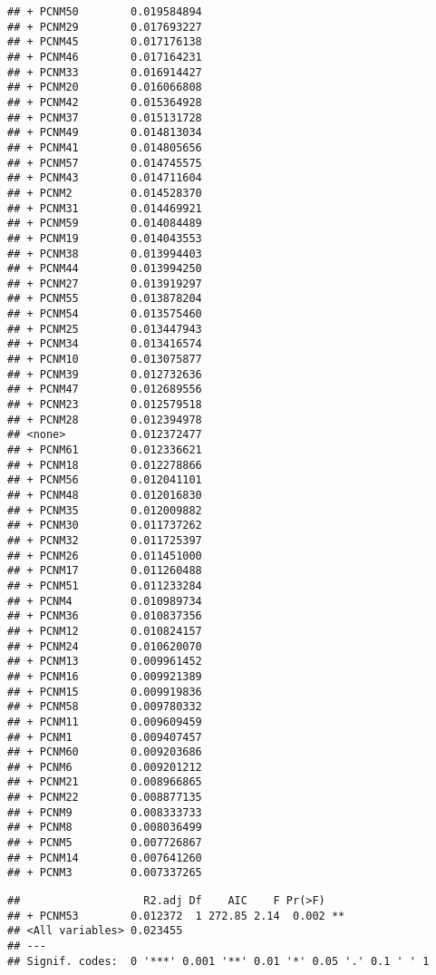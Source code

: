\documentclass[
]{article}
\newenvironment{Shaded}{\begin{snugshade}}{\end{snugshade}}
\newcommand{\NormalTok}[1]{#1}
\newcommand{\OperatorTok}[1]{\textcolor[rgb]{0.81,0.36,0.00}{\textbf{#1}}}
\begin{document}
\begin{verbatim}
## + PCNM50        0.019584894
## + PCNM29        0.017693227
## + PCNM45        0.017176138
## + PCNM46        0.017164231
## + PCNM33        0.016914427
## + PCNM20        0.016066808
## + PCNM42        0.015364928
## + PCNM37        0.015131728
## + PCNM49        0.014813034
## + PCNM41        0.014805656
## + PCNM57        0.014745575
## + PCNM43        0.014711604
## + PCNM2         0.014528370
## + PCNM31        0.014469921
## + PCNM59        0.014084489
## + PCNM19        0.014043553
## + PCNM38        0.013994403
## + PCNM44        0.013994250
## + PCNM27        0.013919297
## + PCNM55        0.013878204
## + PCNM54        0.013575460
## + PCNM25        0.013447943
## + PCNM34        0.013416574
## + PCNM10        0.013075877
## + PCNM39        0.012732636
## + PCNM47        0.012689556
## + PCNM23        0.012579518
## + PCNM28        0.012394978
## <none>          0.012372477
## + PCNM61        0.012336621
## + PCNM18        0.012278866
## + PCNM56        0.012041101
## + PCNM48        0.012016830
## + PCNM35        0.012009882
## + PCNM30        0.011737262
## + PCNM32        0.011725397
## + PCNM26        0.011451000
## + PCNM17        0.011260488
## + PCNM51        0.011233284
## + PCNM4         0.010989734
## + PCNM36        0.010837356
## + PCNM12        0.010824157
## + PCNM24        0.010620070
## + PCNM13        0.009961452
## + PCNM16        0.009921389
## + PCNM15        0.009919836
## + PCNM58        0.009780332
## + PCNM11        0.009609459
## + PCNM1         0.009407457
## + PCNM60        0.009203686
## + PCNM6         0.009201212
## + PCNM21        0.008966865
## + PCNM22        0.008877135
## + PCNM9         0.008333733
## + PCNM8         0.008036499
## + PCNM5         0.007726867
## + PCNM14        0.007641260
## + PCNM3         0.007337265
\end{verbatim}

\begin{Shaded}
\end{Shaded}

\begin{verbatim}
##                   R2.adj Df    AIC    F Pr(>F)   
## + PCNM53        0.012372  1 272.85 2.14  0.002 **
## <All variables> 0.023455                         
## ---
## Signif. codes:  0 '***' 0.001 '**' 0.01 '*' 0.05 '.' 0.1 ' ' 1
\end{verbatim}
\end{document}
